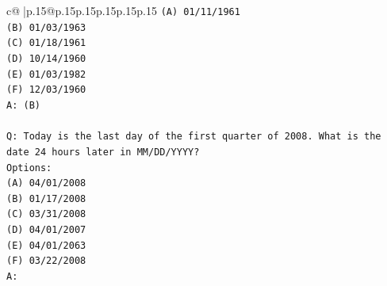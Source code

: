 \documentclass{article}
\begin{document}
{\begin{supertabular}{c@{$\;$}|p{.15\linewidth}@{}p{.15\linewidth}p{.15\linewidth}p{.15\linewidth}p{.15\linewidth}p{.15\linewidth}}
{{{\texttt{(A) 01/11/1961} \\
\texttt{(B) 01/03/1963} \\
\texttt{(C) 01/18/1961} \\
\texttt{(D) 10/14/1960} \\
\texttt{(E) 01/03/1982} \\
\texttt{(F) 12/03/1960} \\
\texttt{A: (B)} \\
\\ 
\texttt{Q: Today is the last day of the first quarter of 2008. What is the date 24 hours later in MM/DD/YYYY?} \\
\texttt{Options:} \\
\texttt{(A) 04/01/2008} \\
\texttt{(B) 01/17/2008} \\
\texttt{(C) 03/31/2008} \\
\texttt{(D) 04/01/2007} \\
\texttt{(E) 04/01/2063} \\
\texttt{(F) 03/22/2008} \\
\texttt{A:} \\
            }
        }
    }
     \\ \\


\end{supertabular}}
\end{document}
